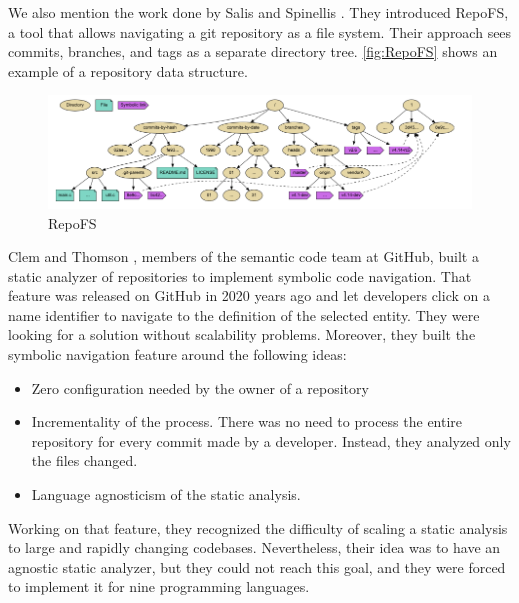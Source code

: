 We also mention the work done by Salis and Spinellis \cite[]{Salis2019}.
They introduced RepoFS, a tool that allows navigating a git repository as a file system. 
Their approach sees commits, branches, and tags as a separate directory tree. 
\autoref{fig:RepoFS} shows an example of a repository data structure. 

\begin{figure}[H]
\centering
  \includegraphics[width=0.9\linewidth]{Salis2019.png} 
  \caption{RepoFS}
  \label{fig:RepoFS}
\end{figure}

Clem and Thomson \cite{Clem2021}, members of the semantic code team at GitHub, built a static analyzer of repositories to implement symbolic code navigation. 
That feature was released on GitHub in 2020 years ago and let developers click on a name identifier to navigate to the definition of the selected entity. 
They were looking for a solution without scalability problems. 
Moreover, they built the symbolic navigation feature around the following ideas:
\begin{itemize}
  \item Zero configuration needed by the owner of a repository
  \item Incrementality of the process. There was no need to process the entire repository for every commit made by a developer. Instead, they analyzed only the files changed. 
  \item Language agnosticism of the static analysis. 
\end{itemize}

Working on that feature, they recognized the difficulty of scaling a static analysis to large and rapidly changing codebases.
Nevertheless, their idea was to have an agnostic static analyzer, but they could not reach this goal, and they were forced to implement it for nine programming languages.  

